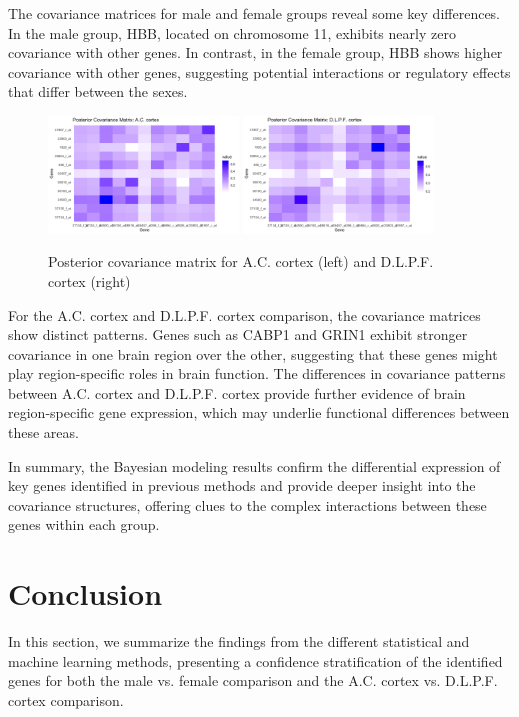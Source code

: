 \documentclass[12pt]{article}
\begin{document}
The covariance matrices for male and female groups reveal some key differences. In the male group, HBB, located on chromosome 11, exhibits nearly zero covariance with other genes. In contrast, in the female group, HBB shows higher covariance with other genes, suggesting potential interactions or regulatory effects that differ between the sexes.

\begin{figure}[h!]
    \centering
    \includegraphics[width=0.45\textwidth]{image/pos_cov_AC}
    \includegraphics[width=0.45\textwidth]{image/pos_cov_DLPF}
    \caption{Posterior covariance matrix for A.C. cortex (left) and D.L.P.F. cortex (right)}
    \label{fig:cov_AC_DLPF}
\end{figure}
\FloatBarrier

For the A.C. cortex and D.L.P.F. cortex comparison, the covariance matrices show distinct patterns. Genes such as CABP1 and GRIN1 exhibit stronger covariance in one brain region over the other, suggesting that these genes might play region-specific roles in brain function. The differences in covariance patterns between A.C. cortex and D.L.P.F. cortex provide further evidence of brain region-specific gene expression, which may underlie functional differences between these areas.

In summary, the Bayesian modeling results confirm the differential expression of key genes identified in previous methods and provide deeper insight into the covariance structures, offering clues to the complex interactions between these genes within each group.

\section{Conclusion}
In this section, we summarize the findings from the different statistical and machine learning methods, presenting a confidence stratification of the identified genes for both the male vs. female comparison and the A.C. cortex vs. D.L.P.F. cortex comparison.
\end{document}
